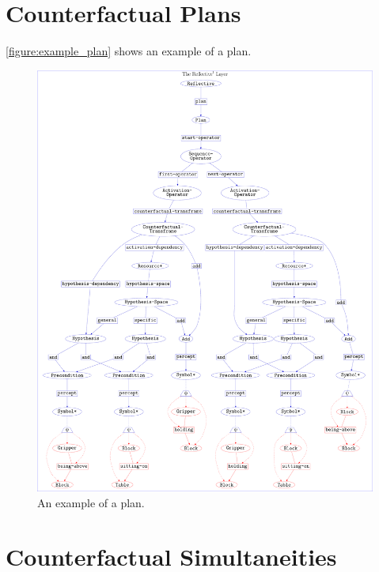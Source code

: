 \section{Counterfactual Plans}

{\mbox{\autoref{figure:example_plan}}} shows an example of a plan.
\begin{figure}
\center
\includegraphics[width=12cm]{gfx/example_plan}
\caption[An example of a plan.]{An example of a plan.}
\label{figure:example_plan}
\end{figure}


\section{Counterfactual Simultaneities}

